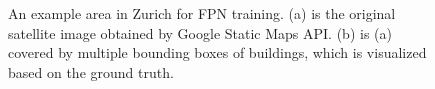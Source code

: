 \begin{figure}[!h]
	\centering
    \caption[An example area in Zurich for FPN training]{An example area in Zurich for FPN training. (a) is the original satellite image obtained by Google Static Maps API. (b) is (a) covered by multiple bounding boxes of buildings, which is visualized based on the ground truth.}
	\label{fig:egareafpn}
\end{figure}